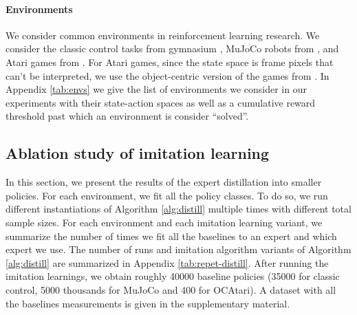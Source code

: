 \paragraph{Environments}
We consider common environments in reinforcement learning research. We consider the classic control tasks from gymnasium \cite{gymnasium}, MuJoCo robots from \cite{mujoco}, and Atari games from \cite{atari}. For Atari games, since the state space is frame pixels that can't be interpreted, we use the object-centric version of the games from \cite{ocatari}. In Appendix \ref{tab:envs} we give the list of environments we consider in our experiments with their state-action spaces as well as a cumulative reward threshold past which an environment is consider ``solved''.

\subsection{Ablation study of imitation learning}\label{sec:res-imit}

In this section, we present the results of the expert distillation into smaller policies. For each environment, we fit all the policy classes. To do so, we run different instantiations of Algorithm \ref{alg:distill} multiple times with different total sample sizes. For each environment and each imitation learning variant, we summarize the number of times we fit all the baselines to an expert and which expert we use. The number of runs and imitation algorithm variants of Algorithm \ref{alg:distill} are summarized in Appendix \ref{tab:repet-distill}. After running the imitation learnings, we obtain roughly 40000 baseline policies (35000 for classic control, 5000 thousands for MuJoCo and 400 for OCAtari). A dataset with all the baselines measurements is given in the supplementary material.

